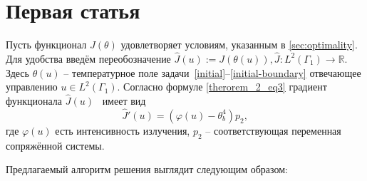 


\section{Первая статья}\label{sec:ch3/sec1}
Пусть функционал $J(\theta)$ удовлетворяет условиям, указанным в \autoref{sec:optimality}.
Для удобства введём переобозначение $\hat{J}(u):=J(\theta(u)), \hat{J}:L^2(\Gamma_1) \to \mathbb{R}$.
Здесь $\theta(u)$ -- температурное поле задачи~\eqref{initial}--\eqref{initial-boundary} отвечающее
управлению $u \in L^2(\Gamma_1)$.
Согласно формуле \eqref{therorem_2_eq3} градиент функционала $\hat{J}(u)$~\cite{grenkin_13} имеет вид
\[
    \hat{J}'(u)= (\varphi(u) -\theta_b^4)p_2,
\]
где $\varphi(u)$ есть интенсивность излучения, $p_2$ -- соответствующая переменная сопряжённой системы.

Предлагаемый алгоритм решения выглядит следующим образом:


